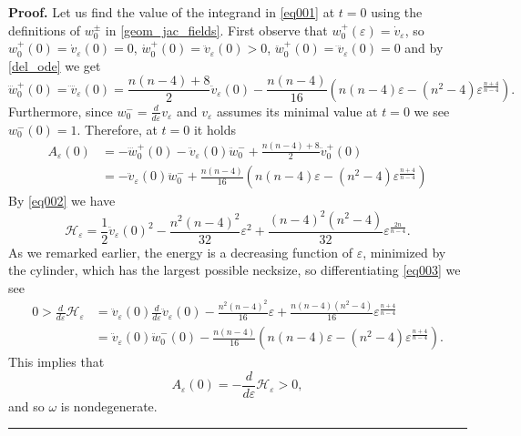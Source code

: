 \documentclass[10pt,a4paper]{amsart}
\newenvironment{proof}[1][Proof]{\noindent\textbf{#1.} }{\hfill\rule{0.5em}{0.5em}}
\begin{document}
\begin{proof}
Let us find the value of the integrand in \eqref{eq001} at $t=0$ using the definitions of $w_0^\pm$ in \eqref{geom_jac_fields}. First observe that $w_0^+(\varepsilon) = \dot v_\varepsilon$, 
so $w_0^+ (0)  =  \dot v_\varepsilon (0) = 0$, $\dot w_0^+ (0)  =  \ddot v_\varepsilon (0) > 0$, $\ddot w_0^+(0)  =  \dddot v_\varepsilon (0) = 0$ and by \eqref{del_ode} we get
$$\dddot w_0^+ (0) = \ddddot v_\varepsilon (0)  =  \frac{n(n-4)+8}{2} \ddot v_\varepsilon(0) - \frac{n(n-4)}{16} 
\left ( n(n-4) \varepsilon - (n^2-4)\varepsilon^{\frac{n+4}{n-4}} \right ) .
$$
Furthermore, since $\displaystyle w_0^- = \frac{d}{d\varepsilon} v_\varepsilon$
and $v_\varepsilon$ assumes its minimal value at $t=0$ we see 
$w_0^-(0) =1$. Therefore, at $t=0$ it holds
\begin{align*}
    A_\varepsilon(0) & =-\dddot w_0^+(0)-\ddot v_\varepsilon(0)\ddot w_0^-+\frac{n(n-4)+8}{2}\ddot v_0^+(0)\\
    & =-\ddot v_\varepsilon(0)\ddot w_0^-+\frac{n(n-4)}{16} 
\left ( n(n-4) \varepsilon - (n^2-4)\varepsilon^{\frac{n+4}{n-4}} \right )
\end{align*}
By \eqref{eq002} we have
\begin{equation} \label{eq003}
\mathcal{H}_\varepsilon = \frac{1}{2} \ddot v_\varepsilon (0)^2 - \frac{n^2(n-4)^2}{32} 
\varepsilon^2 + \frac{(n-4)^2(n^2-4)}{32} \varepsilon^{\frac{2n}{n-4}} . 
\end{equation} 
As we remarked earlier, the energy is a decreasing function of $\varepsilon$, minimized by the 
cylinder, which has the largest possible necksize, so differentiating \eqref{eq003} we see 
\begin{align}
    0  >  \frac{d}{d\varepsilon} \mathcal{H}_\varepsilon & = \ddot v_\varepsilon (0) 
\frac{d}{d\varepsilon} \ddot v_\varepsilon (0) - \frac{n^2(n-4)^2}{16} \varepsilon 
+ \frac{n(n-4)(n^2-4)}{16} \varepsilon^{\frac{n+4}{n-4}} \\ \nonumber 
 & =  \ddot v_\varepsilon (0) \ddot w_0^- (0) - \frac{n(n-4)}{16}(n(n-4) \varepsilon 
- (n^2-4)\varepsilon^{\frac{n+4}{n-4}} ) .
\end{align}
This implies that
$$A_\varepsilon(0)=-\frac{d}{d\varepsilon}\mathcal H_\varepsilon>0,$$
and so $\omega$ is nondegenerate.
 \end{proof}
\end{document}

